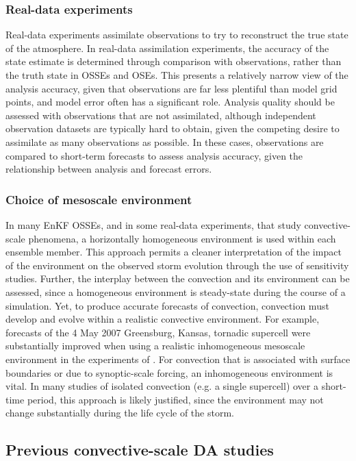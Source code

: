 \subsubsection{Real-data experiments}
Real-data experiments assimilate observations to try to reconstruct the true state of the atmosphere. In real-data assimilation experiments, the accuracy of the state estimate is determined through comparison with observations, rather than the truth state in OSSEs and OSEs. This presents a relatively narrow view of the analysis accuracy, given that observations are far less plentiful than model grid points, and model error often has a significant role. Analysis quality should be assessed with observations that are not assimilated, although independent observation datasets are typically hard to obtain, given the competing desire to assimilate as many observations as possible. In these cases, observations are compared to short-term forecasts to assess analysis accuracy, given the relationship between analysis and forecast errors.

\subsubsection{Choice of mesoscale environment}
In many EnKF OSSEs, and in some real-data experiments, that study convective-scale phenomena, a horizontally homogeneous environment is used within each ensemble member. This approach permits a cleaner interpretation of the impact of the environment on the observed storm evolution through the use of sensitivity studies. Further, the interplay between the convection and its environment can be assessed, since a homogeneous environment is steady-state during the course of a simulation. Yet, to produce accurate forecasts of convection, convection must develop and evolve within a realistic convective environment. For example, forecasts of the 4 May 2007 Greensburg, Kansas, tornadic supercell were substantially improved when using a realistic inhomogeneous mesoscale environment in the experiments of \citet{stensrudgao10}. For convection that is associated with surface boundaries or due to synoptic-scale forcing, an inhomogeneous environment is vital. In many studies of isolated convection (e.g. a single supercell) over a short-time period, this approach is likely justified, since the environment may not change substantially during the life cycle of the storm.

\subsection{Previous convective-scale DA studies}

